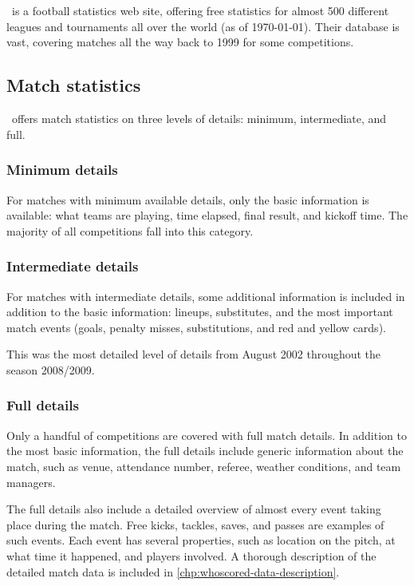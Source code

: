 \section{\whoscoredplain}

\whoscored\ is a football statistics web site, offering free statistics for almost 500 different leagues and tournaments all over the world (as of \today). Their database is vast, covering matches all the way back to 1999 for some competitions.

\subsection{Match statistics}
\label{subsec:whoscored-match-details}

\whoscored\  offers match statistics on three levels of details: minimum, intermediate, and full.

\subsubsection{Minimum details}

For matches with minimum available details, only the basic information is available: what teams are playing, time elapsed, final result, and kickoff time. The majority of all competitions fall into this category.

\subsubsection{Intermediate details}

For matches with intermediate details, some additional information is included in addition to the basic information: lineups, substitutes, and the most important match events (goals, penalty misses, substitutions, and red and yellow cards).

This was the most detailed level of details from August 2002 throughout the season 2008/2009.

\subsubsection{Full details}

Only a handful of competitions are covered with full match details. In addition to the most basic information, the full details include generic information about the match, such as venue, attendance number, referee, weather conditions, and team managers.

The full details also include a detailed overview of almost every event taking place during the match. Free kicks, tackles, saves, and passes are examples of such events. Each event has several properties, such as location on the pitch, at what time it happened, and players involved. A thorough description of the detailed match data is included in \cref{chp:whoscored-data-description}.

